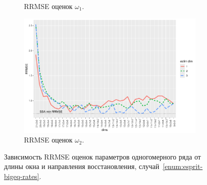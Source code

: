 \documentclass[specialist,
  substylefile=spbu.rtx,
subf,href,colorlinks=true, 12pt]{disser}
\theoremstyle{plain}
\theoremstyle{definition}
\theoremstyle{remark}
\begin{document}
\begin{figure}[!ht]
\begin{subfigure}{0.49\linewidth}
    \caption{RRMSE оценок $\omega_1$.}
    \label{fig:freq1_dims_large_eq_rates}
  \end{subfigure}
  \begin{subfigure}{0.49\linewidth}
    \includegraphics[width=\linewidth]{freq2_dims_large_eq_rates.pdf}
    \caption{RRMSE оценок $\omega_2$.}
    \label{fig:freq2_dims_large_eq_rates}
  \end{subfigure}
  \caption{Зависимость RRMSE оценок параметров одногомерного ряда
    от длины окна и направления восстановления,
  случай~\ref{enum:esprit-bigeq-rates}.}
  \label{fig:dims_large_eq_rates}
\end{figure}
\end{document}
